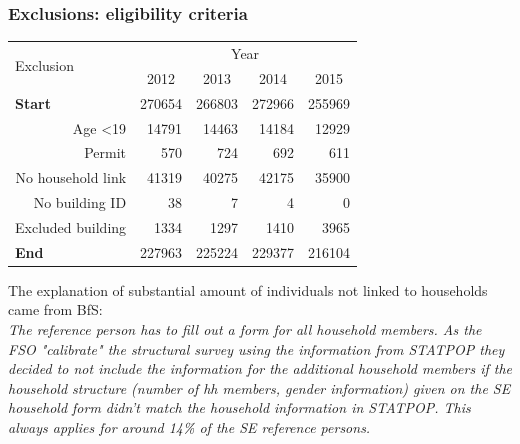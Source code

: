 \documentclass[a4paper, notitlepage, fleqn]{article} %
\begin{document}
\newpage
\subsubsection{Exclusions: eligibility criteria}

\begin{table}[!htbp]
\centering
\begin{tabular}{rrrrr}
\hline
\multicolumn{1}{l}{\multirow{2}{*}{Exclusion}} & \multicolumn{4}{c}{Year}                                                                                  \\
\multicolumn{1}{l}{}                           & \multicolumn{1}{c}{2012} & \multicolumn{1}{c}{2013} & \multicolumn{1}{c}{2014} & \multicolumn{1}{c}{2015} \\
\hline
\multicolumn{1}{l}{\textbf{Start}}             & 270654               & 266803               & 272966               & 255969               \\
\quad Age \textless 19				           & 14791                 & 14463                 & 14184                 & 12929                 \\
\quad Permit      					           & 570                 & 724                 & 692                 & 611                 \\
\quad No household link				           & 41319                 & 40275                 & 42175                 & 35900                 \\
\quad No building ID 					       & 38                 & 7                 & 4                 & 0                 \\
\quad Excluded building 				       & 1334                 & 1297                 & 1410                 & 3965                 \\
\hline
\multicolumn{1}{l}{\textbf{End}}               & 227963                 & 225224                 & 229377                 & 216104                 \\
\hline
\end{tabular}
\end{table}

The explanation of substantial amount of individuals not linked to households came from BfS: \\

\emph{The reference person has to fill out a form for all household members. As the FSO "calibrate" the structural survey using the information from STATPOP they decided to not include the information for the additional household members if the household structure (number of hh members, gender information) given on the SE household form didn’t match the household information in STATPOP. This always applies for around 14\% of the SE reference persons.} \\ 
\end{document}
